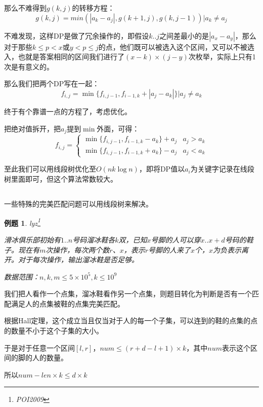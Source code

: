 \documentclass[a4paper]{article}
\newcommand{\kai}{\CJKfamily{kai}}
\newtheorem{problem}{例题}
\begin{document}
那么不难得到$g(k,j)$的转移方程：
$$g(k,j) = min(|a_k - a_j|, g(k+1,j), g(k,j-1)) | a_k \neq a_j$$

不难发现，这样DP是做了冗余操作的，即假设$k..j$之间差最小的是$|a_x - a_y|$，那么对于那些$k \leq p < x$或$y < p \leq j$的点，他们既可以被选入这个区间，又可以不被选入，也就是答案相同的区间我们进行了$(x-k)\times(j-y)$次枚举，实际上只有1次是有意义的。

那么我们把两个DP写在一起：
$$f_{i, j} = \min\{f_{i, j - 1}, f_{i - 1, k} + |a_j - a_k|\} | a_j \neq a_k$$

终于有个靠谱一点的方程了，考虑优化。

把绝对值拆开，把$a_j$提到$\min$外面，可得：
\begin{displaymath}
  f_{i, j} = \left\{ \begin{array}{ll}
    \min\{f_{i, j - 1}, f_{i - 1, k} - a_k\} + a_j & a_j > a_k \\
    \min\{f_{i, j - 1}, f_{i - 1, k} + a_k\} - a_j & a_j < a_k
  \end{array} \right.
\end{displaymath}

至此我们可以用线段树优化至$O(nk\log n)$，即将DP值以$a_i$为关键字记录在线段树里面即可，但这个算法常数较大。

\subsection{\kai{用线段树判断完美匹配}}

一些特殊的完美匹配问题可以用线段树来解决。

\begin{problem}
  lyz\footnote{POI2009}

  滑冰俱乐部初始有$1..n$号码溜冰鞋各$k$双，已知$x$号脚的人可以穿$x..x+d$号码的鞋子。现在有$m$次操作，每次两个数$r$、$x$，表示$r$号脚的人来了$x$个，$x$为负表示离开。对于每次操作，输出溜冰鞋是否足够。

  数据范围：$n,k,m\leq 5\times 10^5, k\leq 10^9$
\end{problem}

我们把人看作一个点集，溜冰鞋看作另一个点集，则题目转化为判断是否有一个匹配满足人的点集被鞋的点集完美匹配。

根据Hall定理，这个成立当且仅当对于人的每一个子集，可以连到的鞋的点集的点的数量不小于这个子集的大小。

于是对于任意一个区间$[l,r]$，$num\leq (r+d-l+1)\times k$，其中$num$表示这个区间的脚的人的数量。

所以$num-len\times k\leq d\times k$
\end{document}
